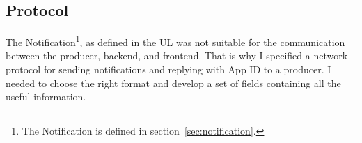 \subsection{Protocol}\label{sec:protocol}

The Notification\footnote{
  The Notification is defined in section~\ref{sec:notification}.
}, as defined in the \ac{UL}
was not suitable for the communication
between the producer, backend, and frontend.
That is why I specified a network protocol
for sending notifications
and replying with App \ac{ID} to a producer.
I needed to choose the right format
and develop a set of fields
containing all the useful information.



